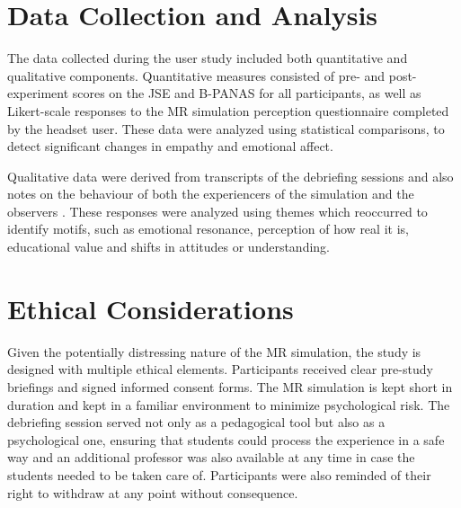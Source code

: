 \section{Data Collection and Analysis}

The data collected during the user study included both quantitative and qualitative components. Quantitative measures consisted of pre- and post-experiment scores on the JSE and B-PANAS for all participants, as well as Likert-scale responses to the MR simulation perception questionnaire completed by the headset user. These data were analyzed using statistical comparisons, to detect significant changes in empathy and emotional affect. 

\vspace{1em}

Qualitative data were derived from transcripts of the debriefing sessions and also notes on the behaviour of both the experiencers of the simulation and the observers . These responses were analyzed using themes which reoccurred to identify motifs, such as emotional resonance, perception of how real it is, educational value and shifts in attitudes or understanding.

\section{Ethical Considerations}

Given the potentially distressing nature of the MR simulation, the study is designed with multiple ethical elements. Participants received clear pre-study briefings and signed informed consent forms. The MR simulation is kept short in duration and kept in a familiar environment to minimize psychological risk. The debriefing session served not only as a pedagogical tool but also as a psychological one, ensuring that students could process the experience in a safe way and an additional professor was also available at any time in case the students needed to be taken care of. Participants were also reminded of their right to withdraw at any point without consequence.
